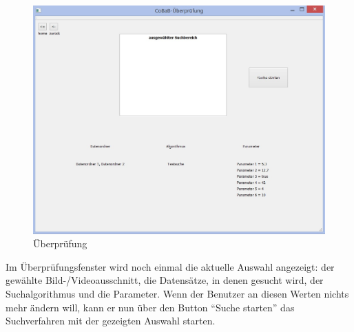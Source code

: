 \begin{figure}[H]
\includegraphics[width=1\linewidth]{img/Ueberpruefung}
\caption{Überprüfung}
\label{fig:überprüfung}
\end{figure}
Im Überprüfungsfenster wird noch einmal die aktuelle Auswahl angezeigt: der gewählte Bild-/Videoausschnitt, die Datensätze, in denen gesucht wird, der Suchalgorithmus und die Parameter. Wenn der Benutzer an diesen Werten nichts mehr ändern will, kann er nun über den Button \enquote{Suche starten} das Suchverfahren mit der gezeigten Auswahl starten.

